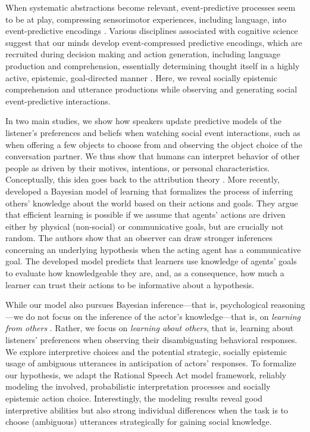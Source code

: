 \documentclass[10pt,a4paper]{article}
\begin{document}
When systematic abstractions become relevant, event-predictive processes seem to be at play, compressing sensorimotor experiences, including language, into event-predictive encodings \cite{Butz:2016,Butz:2017a}.
Various disciplines associated with cognitive science suggest that our minds develop event-compressed predictive encodings, which are recruited during decision making and action generation, including language production and comprehension, essentially determining thought itself in a highly active, epistemic, goal-directed manner  \cite{Baldwin:2019tsi,DuBrow:2019tsi,Elsner:2019tsi,Fallgatter:2019tsi,Knott:2019tsi,Papafragou:2019tsi,Zacks:2019tsi}.
Here, we reveal socially epistemic comprehension and utterance productions while observing and generating social event-predictive interactions.


In two main studies, we show how speakers update predictive models of the listener's preferences and beliefs when watching social event interactions, such as when offering a few objects to choose from and observing the object choice of the conversation partner. 
We thus show that humans can interpret behavior of other people as driven by their motives, intentions, or personal characteristics.
Conceptually, this idea goes back to the attribution theory \cite{jones1965acts, kelley1967attribution, kelley1970social}.
More recently,  developed a Bayesian model of learning that formalizes the process of inferring others' knowledge about the world based on their actions and goals. They argue that efficient learning is possible if we assume that agents' actions are driven either by physical (non-social) or communicative goals, but are crucially not random. The authors show that an observer can draw stronger inferences concerning an underlying hypothesis when the acting agent has a communicative goal.
The developed model predicts that learners use knowledge of agents' goals to evaluate how knowledgeable they are, and, as a consequence, how much a learner can trust their actions to be informative about a hypothesis.
 

While our model also pursues Bayesian inference---that is, psychological reasoning---we do not focus on the inference of the actor's knowledge---that is, on \emph{learning from others} \cite{shafto2012learning}.
Rather, we focus on \emph{learning about others}, that is, learning about listeners' preferences when observing their disambiguating behavioral responses.
We explore interpretive choices and the potential strategic, socially epistemic usage of ambiguous utterances in anticipation of actors' responses. 
To formalize our hypothesis, we adapt the Rational Speech Act model framework, reliably modeling the involved, probabilistic interpretation processes and socially epistemic action choice. 
Interestingly, the modeling results reveal good interpretive abilities but also strong individual differences when the task is to choose (ambiguous) utterances strategically for gaining social knowledge. 
\end{document}
